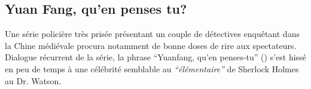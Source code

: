 \clearpage

\subsection{Yuan Fang, qu'en penses tu?}

Une série policière très prisée présentant un couple de détectives enquêtant dans la Chine médiévale procura notamment de bonne doses de rire aux spectateurs. Dialogue récurrent de la série, la phrase ``Yuanfang, qu'en penses-tu'' () s'est hissé en peu de temps à une célébrité semblable au \textit{``élémentaire''} de Sherlock Holmes au Dr. Watson. 


\begin{figure}[ht]
    \centering

\end{figure}
